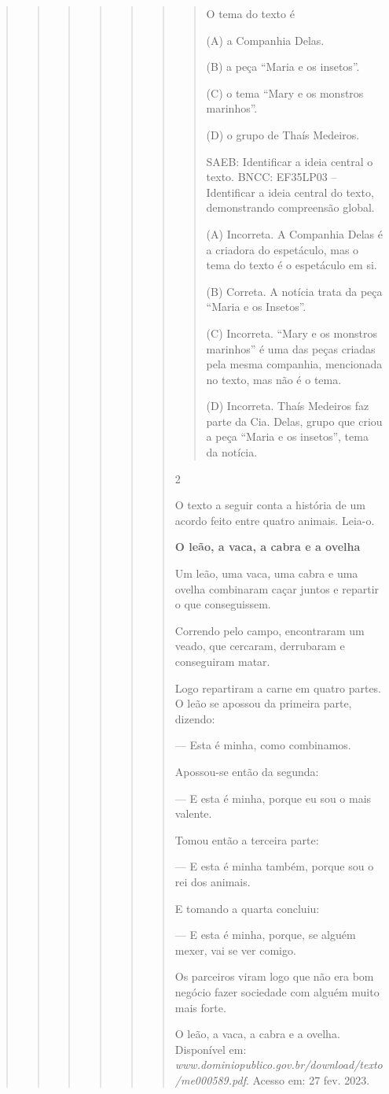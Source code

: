 \begin{boxlist}
{{\begin{quote}
\begin{quote}
\begin{quote}
{\begin{quote}
{\begin{quote}
\begin{quote}
\begin{quote}
O tema do texto é

(A) a Companhia Delas.

(B) a peça ``Maria e os insetos''.

(C) o tema ``Mary e os monstros marinhos''.

(D) o grupo de Thaís Medeiros.

SAEB: Identificar a ideia central o texto.
BNCC: EF35LP03 -- Identificar a ideia central do texto, demonstrando
compreensão global.

(A) Incorreta. A Companhia Delas é a criadora do espetáculo, mas o tema do texto é o espetáculo em si.

(B) Correta. A notícia trata da peça ``Maria e os Insetos''.

(C) Incorreta. ``Mary e os monstros marinhos'' é uma das peças criadas
pela mesma companhia, mencionada no texto, mas não é o tema.

(D) Incorreta. Thaís Medeiros faz parte da Cia. Delas, grupo que criou a
peça ``Maria e os insetos'', tema da notícia.
\end{quote}

\num{2}

O texto a seguir conta a história de um acordo feito entre quatro
animais. Leia-o.

\textbf{O leão, a vaca, a cabra e a ovelha}

Um leão, uma vaca, uma cabra e uma ovelha combinaram
caçar juntos e repartir o que conseguissem.

Correndo pelo campo, encontraram um veado, que
cercaram, derrubaram e conseguiram matar.

Logo repartiram a carne em quatro partes. O leão se
apossou da primeira parte, dizendo:

--- Esta é minha, como combinamos.

Apossou-se então da segunda:

--- E esta é minha, porque eu sou o mais valente.

Tomou então a terceira parte:

--- E esta é minha também, porque sou o rei dos
animais.

E tomando a quarta concluiu:

--- E esta é minha, porque, se alguém mexer, vai se ver
comigo.

Os parceiros viram logo que não era bom negócio fazer
sociedade com alguém muito mais forte.

O leão, a vaca, a cabra e a ovelha. Disponível em:
\emph{www.dominiopublico.gov.br/download/texto/me000589.pdf}.
Acesso em: 27 fev. 2023.


\end{quote}
\end{quote}}
\end{quote}}
\end{quote}
\end{quote}
\end{quote}}}
\end{boxlist}
